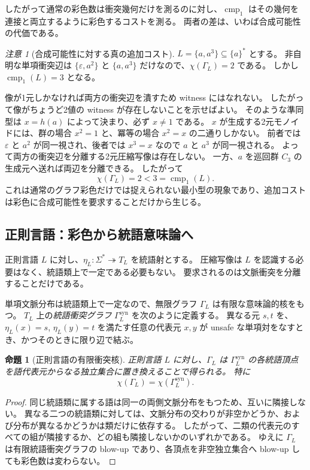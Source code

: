 \documentclass[10pt,a4paper]{ltjsarticle}
\newtheorem{proposition}[theorem]{命題}
\theoremstyle{definition}
\theoremstyle{remark}
\newtheorem{remark}[theorem]{注意}
\newcommand{\cmp}{\operatorname{cmp}}
\begin{document}
したがって通常の彩色数は衝突幾何だけを測るのに対し、$\cmp_1$ はその幾何を連接と両立するように彩色するコストを測る。
両者の差は、いわば合成可能性の代価である。

\begin{remark}[合成可能性に対する真の追加コスト]
\label{conf:rem:strict-price}
$L=\{a,a^3\}\subseteq\{a\}^*$ とする。
非自明な単項衝突辺は
$\{\varepsilon,a^2\}$ と $\{a,a^3\}$
だけなので、$\chi(\Gamma_L)=2$ である。
しかし $\cmp_1(L)=3$ となる。

像が1元しかなければ両方の衝突辺を潰すため witness にはなれない。
したがって像がちょうど2値の witness が存在しないことを示せばよい。
そのような準同型は $x=h(a)$ によって決まり、必ず $x\ne1$ である。
$x$ が生成する2元モノイドには、群の場合 $x^2=1$ と、冪等の場合 $x^2=x$ の二通りしかない。
前者では $\varepsilon$ と $a^2$ が同一視され、後者では $x^3=x$ なので $a$ と $a^3$ が同一視される。
よって両方の衝突辺を分離する2元圧縮写像は存在しない。
一方、$a$ を巡回群 $C_3$ の生成元へ送れば両辺を分離できる。
したがって
\[
\chi(\Gamma_L)=2<3=\cmp_1(L).
\]
これは通常のグラフ彩色だけでは捉えられない最小型の現象であり、追加コストは彩色に合成可能性を要求することだけから生じる。
\end{remark}

\subsection{正則言語：彩色から統語意味論へ}

正則言語 $L$ に対し、$\eta_L:\Sigma^*\twoheadrightarrow T_L$ を統語射とする。
圧縮写像は $L$ を認識する必要はなく、統語類上で一定である必要もない。
要求されるのは文脈衝突を分離することだけである。

単項文脈分布は統語類上で一定なので、無限グラフ $\Gamma_L$ は有限な意味論的核をもつ。
$T_L$ 上の\emph{統語衝突グラフ} $\Gamma_L^{\mathrm{syn}}$ を次のように定義する。
異なる元 $s,t$ を、$\eta_L(x)=s$, $\eta_L(y)=t$ を満たす任意の代表元 $x,y$ が unsafe な単項対をなすとき、かつそのときに限り辺で結ぶ。

\begin{proposition}[正則言語の有限衝突核]
\label{conf:prop:syntactic-conflict-graph}
正則言語 $L$ に対し、$\Gamma_L$ は $\Gamma_L^{\mathrm{syn}}$ の各統語頂点を語代表元からなる独立集合に置き換えることで得られる。
特に
\[
\chi(\Gamma_L)=\chi(\Gamma_L^{\mathrm{syn}}).
\]
\end{proposition}

\begin{proof}
同じ統語類に属する語は同一の両側文脈分布をもつため、互いに隣接しない。
異なる二つの統語類に対しては、文脈分布の交わりが非空かどうか、および分布が異なるかどうかは類だけに依存する。
したがって、二類の代表元のすべての組が隣接するか、どの組も隣接しないかのいずれかである。
ゆえに $\Gamma_L$ は有限統語衝突グラフの blow-up であり、各頂点を非空独立集合へ blow-up しても彩色数は変わらない。
\end{proof}
\end{document}
